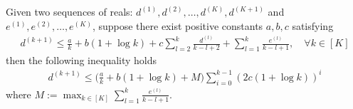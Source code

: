 \begin{lemma}
\label{lemma:bregmandiv_relationship}
    Given two sequences of reals: $d^{(1)}, d^{(2)}, \dots, d^{(K)}, d^{(K+1)}$ and $e^{(1)}, e^{(2)}, \dots, e^{(K)}$, suppose there exist positive constants $a, b, c$ satisfying
    \begin{align}
    \label{eq:breg_div_ub}
        d^{(k+1)} \leq \frac{a}{k} + b(1+\log k) + c\sum_{l=2}^{k} \frac{d^{(l)}}{k-l+2} + \sum_{l=1}^{k} \frac{e^{(l)}}{k-l+1}, \quad \forall k\in [K]
    \end{align}
    then the following inequality holds
    \begin{align}
    \label{eq:breg_div_rel}
        d^{(k+1)} \leq \Big(\frac{a}{k} + b(1+\log k) + M \Big)\sum_{i=0}^{k-1} (2c(1+\log k))^{i}
    \end{align}
    where $M := \max_{k\in [K]}\sum_{l=1}^{k} \frac{e^{(l)}}{k-l+1}$.
\end{lemma}

